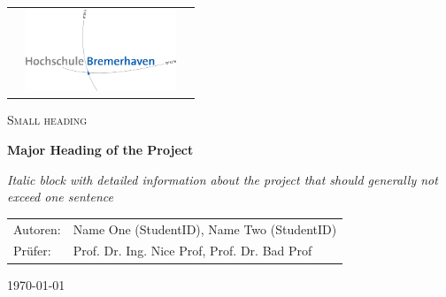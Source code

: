 \begin{titlepage}
\begin{tabular}{lcr}
  \hspace{10cm} &
  \includegraphics[width=170px]{images/hb_logo_2c.jpg}
  \vspace{1cm}
\end{tabular}
	\centering	
	\vspace{1cm}
	{\scshape\Large Small heading \par}
	\vspace{1.5cm}
	{\huge\bfseries Major Heading of the Project\par}
    \vspace{2cm}
    {\Large\itshape 
        Italic block with detailed information about the project that should generally not exceed one sentence
        	\par}
	\vfill
	\begin{tabularx}{\textwidth}{lX}
		Autoren: & Name One (StudentID), Name Two (StudentID) \\
		Prüfer: & Prof. Dr. Ing. Nice Prof, Prof. Dr. Bad Prof  \\
		        
	\end{tabularx}  
    \vfill

	{\large \today \par}       
\end{titlepage}
\restoregeometry